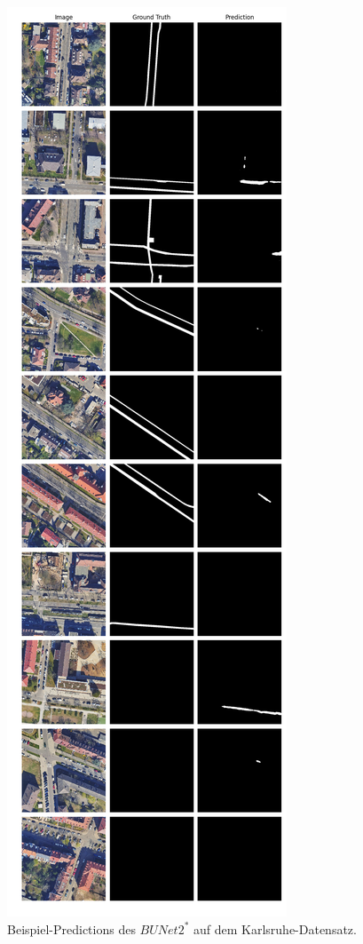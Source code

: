 \begin{figure}
	\centering
	\includegraphics[width=.41\textwidth]{Bilder/Samples-KA/bunet2-s.png} 
	\caption{Beispiel-Predictions des $BUNet2^*$ auf dem Karlsruhe-Datensatz.}
	\label{fig:ka-samples-bunet2-s}
\end{figure}

